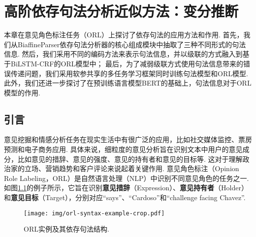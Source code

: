 
\chapter{高阶依存句法分析近似方法：变分推断}
本章在意见角色标注任务（ORL）上探讨了依存句法的应用方法和作用.
首先，我们从BiaffineParser依存句法分析器的核心组成模块中抽取了三种不同形式的句法信息.
然后，我们采用不同的编码方法来表示句法信息，并以级联的方式融入到基于BiLSTM-CRF的ORL模型中；
最后，为了减弱级联方式使用句法信息带来的错误传递问题，我们采用软参共享的多任务学习框架同时训练句法模型和ORL模型.
此外，我们还进一步探讨了在预训练语言模型BERT的基础上，句法信息对于ORL模型的作用.

\section{引言}
意见挖掘和情感分析任务在现实生活中有很广泛的应用，比如社交媒体监控、票房预测和电子商务应用. 具体来说，细粒度的意见分析旨在识别文本中用户的意见成分，比如意见的措辞、意见的强度、意见的持有者和意见的目标等. 这对于理解政治家的立场、营销趋势和客户评论来说起着关键作用. 意见角色标注（Opinion Role Labeling，ORL）是自然语言处理（NLP）中识别不同意见角色的任务之一. 如图\ref{fig:example-syntax}的例子所示，它旨在识别\textbf{意见措辞}（Expression）、\textbf{意见持有者}（Holder）和\textbf{意见目标}（Target），分别对应“says”、“Cardoso”和“challenge facing Chavez”.

\begin{figure}[hb]
    \centering
    \texttt{[image: img/orl-syntax-example-crop.pdf]}
    \caption{ORL实例及其依存句法结构. }
    \label{fig:example-syntax}
\end{figure}

